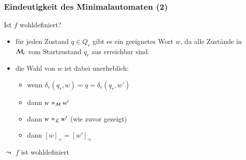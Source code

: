 \documentclass[onlymath]{beamer}
\begin{document}
\begin{frame}[t]\frametitle{Eindeutigkeit des Minimalautomaten (2)}


%
\medskip

Ist $f$ wohldefiniert?\pause
\begin{itemize}
\item für jeden Zustand $q\in Q_r$ gibt es ein geeignetes Wort $w$, da alle Zustände in $\mathcal{M}_r$ vom
Startzustand $q_r$ aus erreichbar sind.\pause
\item die Wahl von $w$ ist dabei unerheblich: 
\begin{itemize}
\item wenn $\delta_r(q_r,w)=q=\delta_r(q_r,w')$ 
\item dann $w\simeq_{\mathcal{M}} w'$
\item dann $w\simeq_{\mathcal{L}} w'$ (wie zuvor gezeigt)
\item dann $[w]_\simeq=[w']_\simeq$
\end{itemize}
\end{itemize}
\bigskip

$\leadsto$ $f$ ist wohldefiniert

\end{frame}
\end{document}
